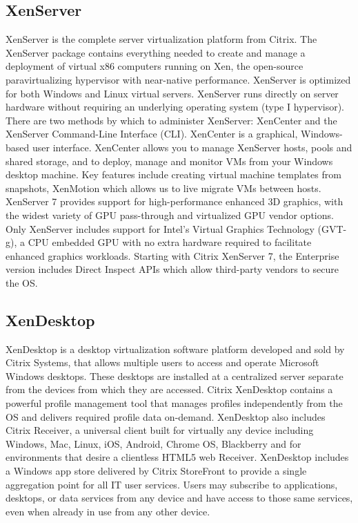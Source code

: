 \begin{enumerate}
\subsection{XenServer}
XenServer is the complete server virtualization platform from Citrix. The XenServer package contains everything needed to create and manage a deployment of virtual x86 computers running on Xen, the open-source paravirtualizing hypervisor with near-native performance. XenServer is optimized for both Windows and Linux virtual servers. XenServer runs directly on server hardware without requiring an underlying operating system (type I hypervisor). There are two methods by which to administer XenServer: XenCenter and the XenServer Command-Line Interface (CLI). XenCenter is a graphical, Windows-based user interface. XenCenter allows you to manage XenServer hosts, pools and shared storage, and to deploy, manage and monitor VMs from your Windows desktop machine. Key features include creating virtual machine templates from snapshots, XenMotion which allows us to live migrate VMs between hosts. XenServer 7 provides support for high-performance enhanced 3D graphics, with the widest variety of GPU pass-through and virtualized GPU vendor options. Only XenServer includes support for Intel’s Virtual Graphics Technology (GVT-g), a CPU embedded GPU with no extra hardware required to facilitate enhanced graphics workloads. Starting with Citrix XenServer 7, the Enterprise version includes Direct Inspect APIs which allow third-party vendors to secure the OS.

\subsection{XenDesktop}
XenDesktop is a desktop virtualization software platform developed and sold by Citrix Systems, that allows multiple users to access and operate Microsoft Windows desktops. These desktops are installed at a centralized server separate from the devices from which they are accessed. Citrix XenDesktop contains a powerful profile management tool that manages profiles independently from the OS and delivers required profile data on-demand. XenDesktop also includes Citrix Receiver, a universal client built for virtually any device including Windows, Mac, Linux, iOS, Android, Chrome OS, Blackberry and for environments that desire a clientless HTML5 web Receiver. XenDesktop includes a Windows app store delivered by Citrix StoreFront to provide a single aggregation point for all IT user services. Users may subscribe to applications, desktops, or data services from any device and have access to those same services, even when already in use from any other device.


\end{enumerate}
